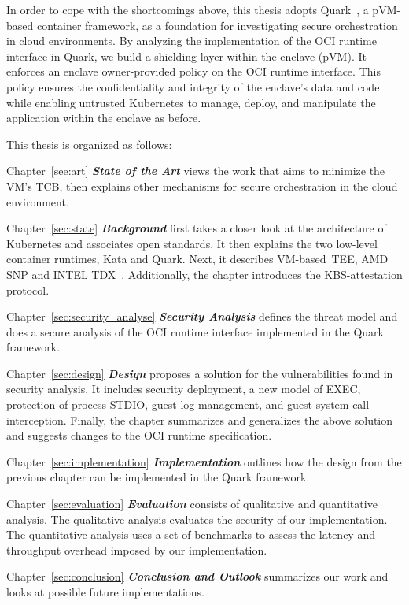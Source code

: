 In order to cope with the shortcomings above, this thesis adopts Quark~\cite*{quark}, a \acrshort{pVM}-based container framework, as a foundation for investigating secure orchestration in cloud environments. By analyzing the implementation of the OCI runtime interface in Quark, we build a shielding layer within the 
enclave (\acrshort{pVM}). It enforces an enclave owner-provided policy on the OCI runtime interface. This policy ensures the confidentiality and integrity of the enclave's data and code while enabling untrusted Kubernetes to manage, deploy, and manipulate the application within the enclave as before.
 
This thesis is organized as follows:

\begin{hangparas}{.25in}{1} 

Chapter~\ref{see:art} \textit{\textbf{State of the Art}} views the work that aims to minimize the VM's TCB, then explains other mechanisms for secure orchestration in the cloud environment. 

Chapter~\ref{sec:state} \textit{\textbf{Background}} first takes a closer look at the architecture of Kubernetes\cite*{k8s} and associates open standards. It then explains the two low-level container runtimes, Kata and Quark. Next, it describes VM-based~\acrshort{TEE}, AMD SNP\cite*{SEV_SNP_white_book} and INTEL TDX~\cite*{Intel_tdx_whitepaper}. Additionally, the chapter 
introduces the KBS-attestation protocol.

Chapter~\ref{sec:security_analyse} \textit{\textbf{Security Analysis}} defines the threat model and does a secure analysis of the OCI runtime interface implemented in the Quark framework.

Chapter~\ref{sec:design} \textit{\textbf{Design}} proposes a solution for the vulnerabilities found in security analysis. It includes security deployment, a new model of EXEC, protection of process STDIO, guest log management, and guest system call interception. Finally, the chapter summarizes and generalizes the above solution and suggests changes to the OCI runtime specification.

Chapter~\ref{sec:implementation} \textit{\textbf{Implementation}} outlines how the design from the previous chapter can be implemented in the Quark framework.

Chapter~\ref{sec:evaluation} \textit{\textbf{Evaluation}} consists of qualitative and quantitative analysis. The qualitative analysis evaluates the security of our implementation. The quantitative analysis uses a set of benchmarks to assess the latency and throughput overhead imposed by our implementation.

Chapter~\ref{sec:conclusion} \textit{\textbf{Conclusion and Outlook}} summarizes our work and looks at possible future implementations.

\end{hangparas}

\cleardoublepage

